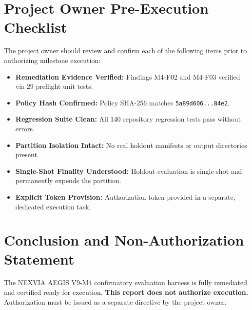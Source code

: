 \documentclass[10pt,a4paper]{article}
\begin{document}
\section{Project Owner Pre-Execution Checklist}
The project owner should review and confirm each of the following items prior to authorizing milestone execution:
\begin{itemize}
    \item[$\square$] \textbf{Remediation Evidence Verified:} Findings M4-F02 and M4-F03 verified via 29 preflight unit tests.
    \item[$\square$] \textbf{Policy Hash Confirmed:} Policy SHA-256 matches \texttt{5a89d606...84e2}.
    \item[$\square$] \textbf{Regression Suite Clean:} All 140 repository regression tests pass without errors.
    \item[$\square$] \textbf{Partition Isolation Intact:} No real holdout manifests or output directories present.
    \item[$\square$] \textbf{Single-Shot Finality Understood:} Holdout evaluation is single-shot and permanently expends the partition.
    \item[$\square$] \textbf{Explicit Token Provision:} Authorization token provided in a separate, dedicated execution task.
\end{itemize}

\section{Conclusion and Non-Authorization Statement}
The NEXVIA AEGIS V9-M4 confirmatory evaluation harness is fully remediated and certified ready for execution. \textbf{This report does not authorize execution.} Authorization must be issued as a separate directive by the project owner.
\end{document}
